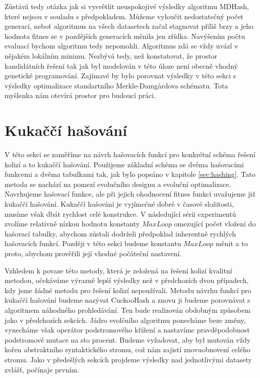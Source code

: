Zůstává tedy otázka jak si vysvětlit neuspokojivé výsledky algoritmu MDHash, které nejsou v souladu s předpokladem. Můžeme vyloučit
nedostatečný počet generací, neboť algoritmus na všech datasetech začal stagnovat příliš brzy a jeho hodnota fitnes se v pozdějších
generacích měnila jen zřídka. Navýšením počtu evaluací bychom algoritmu tedy nepomohli. Algoritmus zdá se vždy uvázl v nějakém lokálním
minimu. Nezbývá tedy, než konstatovat, že prostor kandidátních řešení tak jak byl modelován v této úloze není obecně vhodný genetické
programování. Zajímavé by bylo porovnat výsledky v této sekci s výsledky optimalizace standartního Merkle-Damg\r{a}rdova schématu. Tota
myšlenka nám otevírá prostor pro budoucí práci.

\newpage
\section{Kukaččí hašování}

V této sekci se zaměříme na návrh hašovacích funkcí pro konkrétní schéma řešení kolizí a to kukaččí hašování. Použijeme základní schéma
se dvěma hašovacími funkcemi a dvěma tabulkami tak, jak bylo popsáno v kapitole \ref{sec:hashing}. Tato metoda se nachází na pomezí
evolučního designu a evoluční optimalizace. Navrhujeme hašovací funkce, ale při jejich ohodnocení fitnes funkcí uvažujeme již kukaččí
hašování. Kukaččí hašování je vyjímečné dobré v časové složitosti, musíme však dbát rychlost celé konstrukce. V následující sérii 
experimentů zvolíme relativně nízkou hodnotu konstanty $MaxLoop$ omezující počet vložení do hašovací tabulky, abychom zůstali dodrželi
předpoklad inherentně rychlých hašovacích funkcí. Později v této sekci budeme konstantu $MaxLoop$ měnit a to proto, abychom prověřili
její vhodné počáteční nastavení. 

Vzhledem k povaze této metody, která je zeložená na řešení kolizí kvalitní metodou, očekáváme výrazně lepší výsledky než v předchozích dvou
případech, kdy jsme žádné metodu pro řešení kolizí nepoužívali. Metodu návrhu funkcí pro kukaččí hašování budeme nazývat CuckooHash a
znovu ji budeme porovnávat s algoritmem náhodného prohledávání. Ten bude realizován obdobným způsobem jako v předchozích sekcích. Jádro
evolčního algoritmu ponecháme beze změny, vynecháme však operátor podstromového křížení a nastavíme pravděpodobnost podstromové mutace
na sto procent. Budeme vyžadovat, aby byl mutován vždy kořen abstraktního syntaktického stromu, což nám zajistí znovuobnovení celého stromu.
Jako v předešlých sekcích projdeme výsledky nad jednotlivými datasety zvlášť, počínaje prvním.

